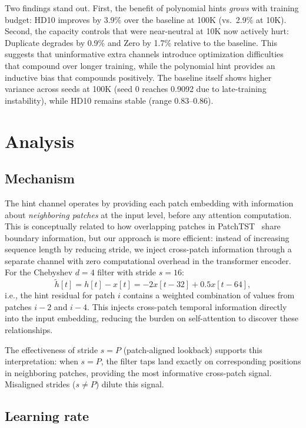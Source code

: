 \documentclass[11pt]{article}
\begin{document}
Two findings stand out. First, the benefit of polynomial hints \emph{grows} with training budget: HD10 improves by 3.9\% over the baseline at 100K (vs.\ 2.9\% at 10K). Second, the capacity controls that were near-neutral at 10K now actively hurt: Duplicate degrades by 0.9\% and Zero by 1.7\% relative to the baseline. This suggests that uninformative extra channels introduce optimization difficulties that compound over longer training, while the polynomial hint provides an inductive bias that compounds positively. The baseline itself shows higher variance across seeds at 100K (seed 0 reaches 0.9092 due to late-training instability), while HD10 remains stable (range 0.83--0.86).

\section{Analysis}

\subsection{Mechanism}

The hint channel operates by providing each patch embedding with information about \emph{neighboring patches} at the input level, before any attention computation. This is conceptually related to how overlapping patches in PatchTST~\citep{nie2023patchtst} share boundary information, but our approach is more efficient: instead of increasing sequence length by reducing stride, we inject cross-patch information through a separate channel with zero computational overhead in the transformer encoder. For the Chebyshev $d=4$ filter with stride $s=16$:
\[
\tilde{h}[t] = h[t] - x[t] = -2 x[t-32] + 0.5 x[t-64],
\]
i.e., the hint residual for patch $i$ contains a weighted combination of values from patches $i-2$ and $i-4$. This injects cross-patch temporal information directly into the input embedding, reducing the burden on self-attention to discover these relationships.

The effectiveness of stride $s = P$ (patch-aligned lookback) supports this interpretation: when $s = P$, the filter taps land exactly on corresponding positions in neighboring patches, providing the most informative cross-patch signal. Misaligned strides ($s \neq P$) dilute this signal.

\subsection{Learning rate}
\label{sec:lr}
\end{document}
